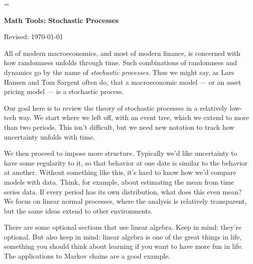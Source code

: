 \documentclass[11pt]{article}
\begin{document}
\parskip=\bigskipamount
\parindent=0.0in
\thispagestyle{empty}


\bigskip\bigskip
\centerline{\Large \bf Math Tools:  Stochastic Processes}
\centerline{Revised: \today}


\begin{comment}

** stress choice of state that makes something Markov

** go through shortcut on unconditional distribution (sep section?) 

---------------------------------------------------------


*** big picture overview:  about conditional probs, hard to do in one dimension...

?? *** think of this as diff rvs **** \\

\end{comment}


\bigskip
All of modern macroeconomics, and most of modern finance,
is concerned with how randomness unfolds through time.
Such combinations of randomness and dynamics go by the name
of {\it stochastic processes\/}.
Thus we might say, as Lars Hansen and Tom Sargent often do,
that a macroeconomic model --- or an asset pricing model ---
is a stochastic process.

Our goal here is to review the theory of stochastic processes
in a relatively low-tech way.
We start where we left off, with an event tree,
which we extend to more than two periods.
This isn't difficult, but we need new notation to track how
uncertainty unfolds with time.

We then proceed to impose more structure.
Typically we'd like uncertainty to have some regularity to it,
so that behavior at one date is similar to the behavior at another.
Without something like this, it's hard to know how we'd compare models with data.
Think, for example, about estimating the mean from time series data.
If every period has its own distribution, what does this even mean?
We focus on linear normal processes, where the analysis is relatively transparent,
but the same ideas extend to other environments.

There are some optional sections that use linear algebra.
Keep in mind:  they're optional.
But also keep in mind:  linear algebra is one of the great things in life,
something you should think about learning if you want to have more fun in life.
The applications to Markov chains are a good example.
\end{document}
